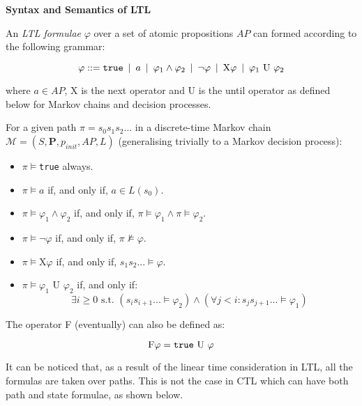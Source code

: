 {\begin{defi}
{\setlength{\parskip}{2em}
\textbf{Syntax and Semantics of LTL}\vspace{1em}\\}
{\setlength{\parskip}{1em} 
An \textit{LTL formulae} $\varphi$ over a set of atomic propositions $AP$ can formed according to the following grammar:

\begin{equation}
	\varphi ::= \text{\texttt{true}} \:\mid\: a \:\mid\: \varphi_1 \wedge \varphi_2 \:\mid\: \neg \varphi \:\mid\: \text{X} \varphi \:\mid\: \varphi_1 \text{ U } \varphi_2
\end{equation}

where $a \in AP$, X is the next operator and U is the until operator as defined below for Markov chains and decision processes.

For a given path $\pi = s_0s_1s_2...$ in a discrete-time Markov chain $\mathcal{M} = (S, \mathbf{P}, p_{init}, AP, L)$ (generalising trivially to a Markov decision process):
\begin{itemize}
	\item $\pi \models $\texttt{true} always.
	\item $\pi \models a$ if, and only if, $a \in L(s_0)$.
	\item $\pi \models \varphi_1 \wedge \varphi_2$ if, and only if, $\pi \models \varphi_1 \wedge \pi \models \varphi_2$.
	\item $\pi \models \neg \varphi$ if, and only if, $\pi \not\models \varphi$.
	\item $\pi \models \text{X}\varphi$ if, and only if, $s_1s_2... \models \varphi$.
	\item $\pi \models \varphi_1\text{ U }\varphi_2$ if, and only if:
	 \begin{equation}
	 	\exists i \geq 0 \text{ s.t. } (s_is_{i+1}... \models \varphi_2) \wedge (\forall j < i: s_js_{j+1}... \models \varphi_1)
	\end{equation}
\end{itemize}

The operator F (eventually) can also be defined as:

\begin{equation}
	\text{F} \varphi = \text{\texttt{true}} \text{ U } \varphi
\end{equation}

}
\end{defi}}

It can be noticed that, as a result of the linear time consideration in LTL, all the formulas are taken over paths. This is not the case in CTL which can have both path and state formulae, as shown below.


